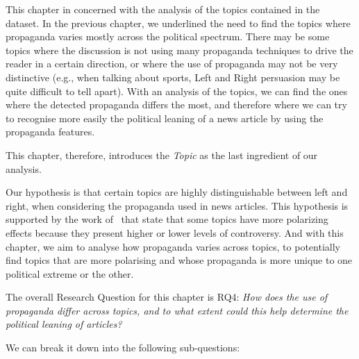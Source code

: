 This chapter in concerned with the analysis of the topics contained in the dataset. In the previous chapter, we underlined the need to find the topics where propaganda varies mostly across the political spectrum. There may be some topics where the discussion is not using many propaganda techniques to drive the reader in a certain direction, or where the use of propaganda may not be very distinctive (e.g., when talking about sports, Left and Right persuasion may be quite difficult to tell apart). With an analysis of the topics, we can find the ones where the detected propaganda differs the most, and therefore where we can try to recognise more easily the political leaning of a news article by using the propaganda features.

This chapter, therefore, introduces the \emph{Topic} as the last ingredient of our analysis.

Our hypothesis is that certain topics are highly distinguishable between left and right, when considering the propaganda used in news articles.
This hypothesis is supported by the work of~\cite{garimella2018quantifying,treuillier2022being} that state that some topics have more polarizing effects because they present higher or lower levels of controversy.
And with this chapter, we aim to analyse how propaganda varies across topics, to potentially find topics that are more polarising and whose propaganda is more unique to one political extreme or the other.






The overall Research Question for this chapter is RQ4: \emph{How does the use of propaganda differ across topics, and to what extent could this help determine the political leaning of articles?}

We can break it down into the following sub-questions:

